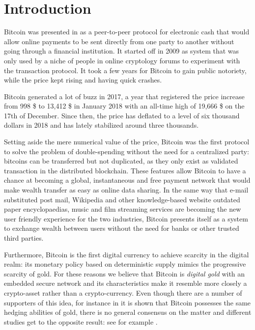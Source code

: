 \chapter{Introduction}
\label{chpr:intro}

\bigskip


Bitcoin was presented in \citep{BTC2008} as a peer-to-peer protocol for electronic cash that would allow online payments to be sent directly from one party to another without going through a financial institution.
It started off in 2009 as system that was only used by a niche of people in online cryptology forums  to experiment with the transaction protocol. It took a few years for Bitcoin to gain public notoriety, while the price kept rising and having quick crashes. 

Bitcoin generated a lot of buzz in 2017, a year that registered the price increase from 998 \$ to 13,412 \$ in January 2018 with an all-time high of 19,666 \$ on the 17th of December. Since then, the price has deflated to a level of six thousand dollars in 2018 and has lately stabilized around three thousands.

Setting aside the mere numerical value of the price, Bitcoin was the first protocol to solve the problem of double-spending without the need for a centralized party: bitcoins can be transferred but not duplicated, as they only exist as validated transaction in the distributed blockchain. 
These features allow Bitcoin to have a chance at becoming a global, instantaneous and free payment network that would make wealth transfer as easy as online data sharing.
In the same way that e-mail substituted post mail, Wikipedia and other knowledge-based website outdated paper encyclopaedias, music and film streaming services are becoming the new user friendly experience for the two industries, Bitcoin presents itself as a system to exchange wealth between users without the need for banks or other trusted third parties.

Furthermore, Bitcoin is the first digital currency to achieve scarcity in the digital realm: its monetary policy based on deterministic supply mimics the progressive scarcity of gold. For these reasons we believe that Bitcoin  is \textit{digital gold} with an embedded secure network and its characteristics make it resemble more closely a crypto-asset rather than a crypto-currency.
Even though there are a number of supporters of this idea, for instance in \citep{DYHRBERG2016} it is shown that Bitcoin possesses the same hedging abilities of gold, there is no general consensus on the matter and different studies get to the opposite result: see for example \citep{KLEIN2018}.

